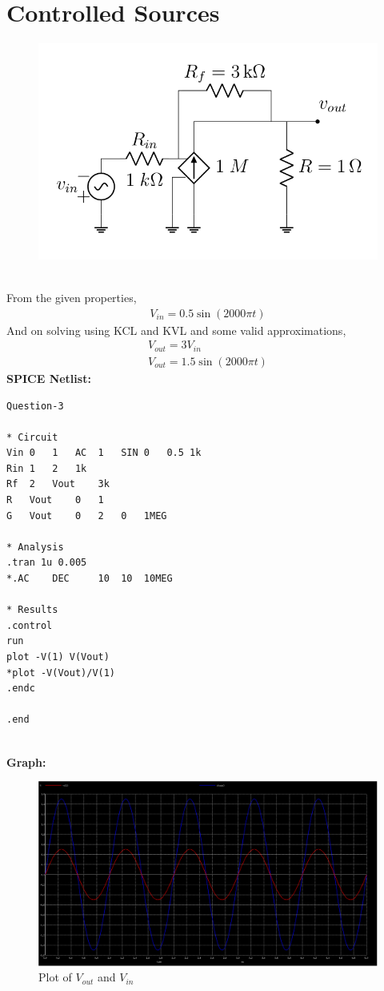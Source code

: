 \documentclass{article}
\begin{document}
\section{Controlled Sources}
\begin{figure}[!ht]
    \centering
    \includegraphics[scale=0.325]{Images/3.png}
\end{figure}\\
From the given properties,
\begin{align}
    V_{in} = 0.5\sin(2000\pi t)
\end{align}
And on solving using KCL and KVL and some valid approximations,
\begin{align}
    V_{out} = 3V_{in} \\
    V_{out} = 1.5\sin(2000\pi t)
\end{align}
\textbf{SPICE Netlist:}
\begin{lstlisting}
Question-3

* Circuit
Vin	0	1	AC	1	SIN	0	0.5	1k
Rin	1	2	1k
Rf	2	Vout	3k
R	Vout	0	1
G	Vout	0	2	0	1MEG

* Analysis
.tran 1u 0.005
*.AC 	DEC 	10	10	10MEG

* Results
.control
run
plot -V(1) V(Vout)
*plot -V(Vout)/V(1)
.endc

.end
\end{lstlisting}\\
\textbf{Graph:}
\begin{figure}[!ht]
    \centering
    \includegraphics[scale=0.27]{Images/3_Graph.png}
    \caption{Plot of ${V_{out}}$ and ${V_{in}}$}
\end{figure}
\end{document}
